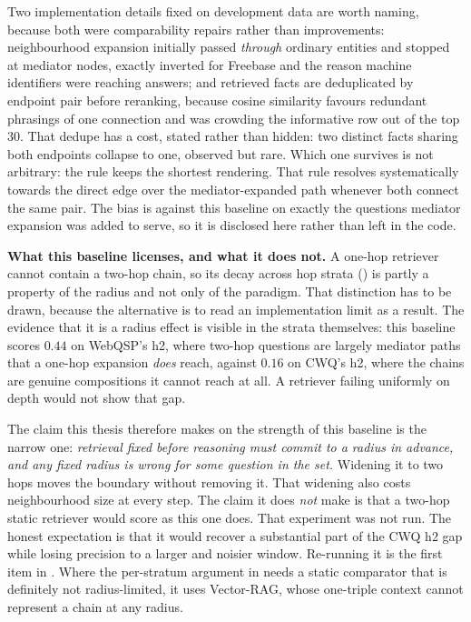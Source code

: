 Two implementation details fixed on development data are worth naming, because
both were comparability repairs rather than improvements: neighbourhood
expansion initially passed \emph{through} ordinary entities and stopped at
mediator nodes, exactly inverted for Freebase and the reason machine identifiers
were reaching answers; and retrieved facts are deduplicated by endpoint pair
before reranking, because cosine similarity favours redundant phrasings of one
connection and was crowding the informative row out of the top $30$. That dedupe
has a cost, stated rather than hidden: two distinct facts sharing both endpoints
collapse to one, observed but rare. Which one survives is not arbitrary: the
rule keeps the shortest rendering. That rule resolves systematically towards
the direct edge over the mediator-expanded path whenever both connect the same
pair. The bias is against this baseline on exactly the questions mediator
expansion was added to serve, so it is disclosed here rather than left in the
code.

\textbf{What this baseline licenses, and what it does not.} A one-hop retriever
cannot contain a two-hop chain, so its decay across hop strata
() is partly a property of the radius and not only of the
paradigm. That distinction has to be drawn, because the alternative is to read
an implementation limit as a result. The evidence that it is a radius effect is
visible in the strata themselves: this baseline scores $0.44$ on WebQSP's
\textsf{h2}, where two-hop questions are largely mediator paths that a one-hop
expansion \emph{does} reach, against $0.16$ on CWQ's \textsf{h2}, where the
chains are genuine compositions it cannot reach at all. A retriever failing
uniformly on depth would not show that gap.

The claim this thesis therefore makes on the strength of this baseline is the
narrow one: \emph{retrieval fixed before reasoning must commit to a radius in
advance, and any fixed radius is wrong for some question in the set.} Widening
it to two hops moves the boundary without removing it. That widening also costs
neighbourhood size at every step. The claim it does \emph{not} make is that a
two-hop static retriever would score as this one does. That experiment was not
run. The honest expectation is that it would recover a substantial part of the
CWQ \textsf{h2} gap while losing precision to a larger and noisier window.
Re-running it is the first item in . Where the
per-stratum argument in  needs a static comparator that is
definitely not radius-limited, it uses Vector-RAG, whose one-triple context
cannot represent a chain at any radius.

